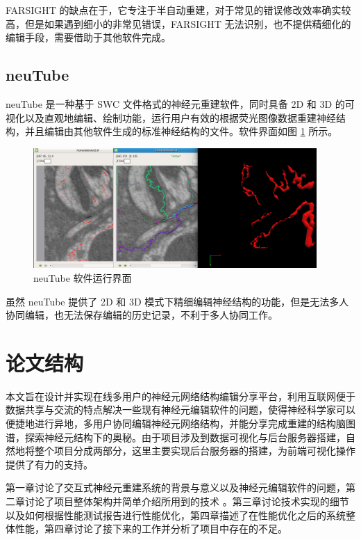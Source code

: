 FARSIGHT 的缺点在于，它专注于半自动重建，对于常见的错误修改效率确实较高，但是如果遇到细小的非常见错误，FARSIGHT 无法识别，也不提供精细化的编辑手段，需要借助于其他软件完成。

\subsection{neuTube}
neuTube 是一种基于 SWC 文件格式的神经元重建软件，同时具备 2D 和 3D 的可视化以及直观地编辑、绘制功能，运行用户有效的根据荧光图像数据重建神经结构，并且编辑由其他软件生成的标准神经结构的文件。软件界面如图 \ref{neutube} 所示。

\begin{figure}
\centering
\includegraphics[width=108mm]{images/neutube}
\caption{neuTube 软件运行界面}
\label{neutube}
\end{figure}

虽然 neuTube 提供了 2D 和 3D 模式下精细编辑神经结构的功能，但是无法多人协同编辑，也无法保存编辑的历史记录，不利于多人协同工作。

\section{论文结构}
本文旨在设计并实现在线多用户的神经元网络结构编辑分享平台，利用互联网便于数据共享与交流的特点解决一些现有神经元编辑软件的问题，使得神经科学家可以便捷地进行异地，多用户协同编辑神经元网络结构，并能分享完成重建的结构脑图谱，探索神经元结构下的奥秘。由于项目涉及到数据可视化与后台服务器搭建，自然地将整个项目分成两部分，这里主要实现后台服务器的搭建，为前端可视化操作提供了有力的支持。

第一章讨论了交互式神经元重建系统的背景与意义以及神经元编辑软件的问题，第二章讨论了项目整体架构并简单介绍所用到的技术
。第三章讨论技术实现的细节以及如何根据性能测试报告进行性能优化，第四章描述了在性能优化之后的系统整体性能，第四章讨论了接下来的工作并分析了项目中存在的不足。

